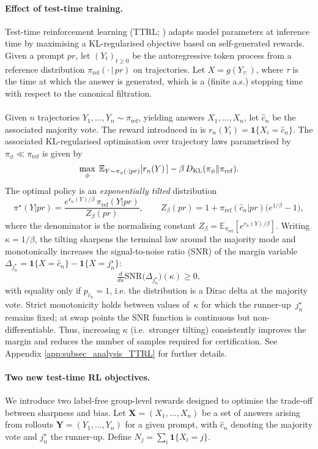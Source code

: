 \paragraph{Effect of test-time training.} 
Test-time reinforcement learning (TTRL; \citealp{zuo2025ttrl}) adapts model parameters at inference
time by maximising a KL-regularised objective based on self-generated rewards.  Given a prompt
\(pr\), let $(Y_t)_{t\geq 0}$ be the autoregressive token process from a reference distribution $\pi_{\text{ref}}(\cdot \, |\, pr)$ on trajectories.  Let $X = g(Y_{\tau:})$, where $\tau$ is the time at which the answer is generated, which is a (finite a.s.) stopping time with respect to the canonical filtration.
\\\\
Given $n$ trajectories $Y_1, \ldots, Y_n \sim \pi_{\text{ref}}$, yielding answers $X_1, \ldots, X_n$, let $\widehat{c}_n$ be the associated majority vote.  The reward introduced in \cite{zuo2025ttrl} is $r_n(Y_i) = \mathbf{1}\lbrace X_i = \widehat{c}_n\rbrace$.   The associated KL-regularised optimisation over trajectory laws parametrised by $\pi_{\phi} \ll \pi_{\text{ref}}$ is given by
\[
\max_{\phi}
\;
\mathbb{E}_{Y\sim\pi_\phi(\cdot|pr)}[r_n(Y)\,]
-\beta\,D_{\mathrm{KL}}(\pi_\phi\|\pi_{\mathrm{ref}}).
\]
The optimal policy is an \emph{exponentially tilted} distribution
\[
\pi^{\star}(Y|pr)
=\frac{e^{r_n(Y)/\beta}\,\pi_{\mathrm{ref}}(Y|pr)}
       {Z_\beta(pr)},\qquad
Z_\beta(pr)
=1+\pi_{\mathrm{ref}}(\widehat c_n|pr)\bigl(e^{1/\beta}-1\bigr),
\]
where the denominator is the normalising constant
\(Z_\beta=\mathbb{E}_{\pi_{\mathrm{ref}}}[e^{r_n(Y)/\beta}]\).
Writing \(\kappa=1/\beta\), the tilting sharpens the terminal law around the majority mode and
monotonically increases the signal-to-noise ratio (SNR) of the margin variable
\(\Delta_{j^\star_n}=\mathbf 1\{X=\widehat c_n\}-\mathbf 1\{X=j^\star_n\}\):
\[
\tfrac{d}{d\kappa}\mathrm{SNR}\bigl(\Delta_{j^\star_n}\bigr)(\kappa)\ge 0,
\]
with equality only if \(p_{\hat c_n}=1\), i.e. the distribution is a Dirac delta at the majority vote.
Strict monotonicity holds between values of~\(\kappa\) for which the runner-up~\(j^\star_n\) remains
fixed; at swap points the SNR function is continuous but non-differentiable.  Thus, increasing
\(\kappa\) (i.e.\ stronger tilting) consistently improves the margin and reduces the number of samples
required for certification.  See Appendix \ref{app:subsec_analysis_TTRL} for further details.


\paragraph{Two new test-time RL objectives.}
We introduce two label-free group-level rewards designed to optimise the trade-off between sharpness
and bias.  Let $\mathbf{X} = (X_1, \dots, X_n)$ be a set of answers arising from rollouts $\mathbf{Y} =(Y_1, \ldots, Y_n)$ for a given prompt, with $\widehat{c}_n$ denoting the majority vote and $j_n^\star$  the runner-up. Define $N_j= \scriptstyle\sum_i\mathbf{1}\{X_i=j\}$. 

